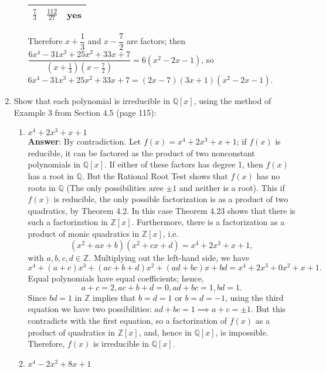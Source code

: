 \documentclass{article}
\begin{document}
\begin{enumerate}
\begin{enumerate}[start=2]
\begin{center}
\begin{tabular}{|c|c|c|}
                                    $\frac{7}{3}$  & $\frac{112}{27}$ & yes      \\
                                    \hline
                              \end{tabular}
                        \end{center}
                        Therefore $x+\dfrac{1}{3}$ and $x-\dfrac{7}{2}$ are factors; then $\dfrac{6x^4-31x^3+25x^2+33x+7}{(x+\frac{1}{3})(x-\frac{7}{2})}=6(x^2-2x-1)$, so $6x^4-31x^3+25x^2+33x+7=(2x-7)(3x+1)(x^2-2x-1)$.
            \end{enumerate}
      \item Show that each polynomial is irreducible in $\mathbb{Q}[x]$, using the method of Example 3 from Section 4.5 (page 115):
            \begin{enumerate}
                  \item $x^4+2x^3+x+1$\\
                        \textbf{Answer}: By contradiction. Let $f(x)=x^4+2x^3+x+1$; if $f(x)$ is reducible, it can be factored as the product of two nonconstant polynomials in $\mathbb{Q}[x]$. If either of these factors has degree 1, then $f(x)$ has a root in $\mathbb{Q}$. But the Rational Root Test shows that $f(x)$ has no roots in $\mathbb{Q}$ (The only possibilities aree $\pm 1$ and neither is a root). This if $f(x)$ is reducible, the only possible factorization is as a product of two quadratics, by Theorem 4.2. In this case Theorem 4.23 shows that there is such a factorization in $\mathbb{Z}[x]$. Furthermore, there is a factorization as a product of monic quadratics in $\mathbb{Z}[x]$, i.e. \[(x^2+ax+b)(x^2+cx+d)=x^4+2x^3+x+1,\] with $a,b,c,d\in\mathbb{Z}$. Multiplying out the left-hand side, we have \[x^4+(a+c)x^3+(ac+b+d)x^2+(ad+bc)x+bd=x^4+2x^3+0x^2+x+1.\] Equal polynomials have equal coefficients; hence, \[a+c=2,ac+b+d=0,ad+bc=1,bd=1.\] Since $bd=1$ in $\mathbb{Z}$ implies that $b=d=1$ or $b=d=-1$, using the third equation we have two possibilities: $ad+bc=1\implies a+c=\pm 1$. But this contradicts with the first equation, so a factorization of $f(x)$ as a product of quadratics in $\mathbb{Z}[x]$, and, hence in $\mathbb{Q}[x]$, is impossible. Therefore, $f(x)$ is irreducible in $\mathbb{Q}[x]$.
                  \item $x^4-2x^2+8x+1$\\

\end{enumerate}
\end{enumerate}
\end{document}
